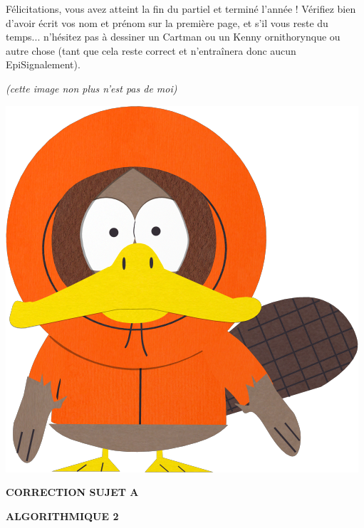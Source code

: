 \documentclass[11pt,a4paper]{article}
\newcommand{\TitreMatiere}{Algorithmique 2}
\begin{document}
\noindent Félicitations, vous avez atteint la fin du partiel et terminé l'année !
Vérifiez bien d'avoir écrit vos nom et prénom sur la première page, et s'il vous reste du temps... n'hésitez pas à dessiner un Cartman ou un Kenny ornithorynque ou autre chose (tant que cela reste correct et n'entraînera donc aucun EpiSignalement).

\begin{center}

{\small \textit{(cette image non plus n'est pas de moi)} }

\medskip

\includegraphics[scale=0.2]{img/kenny-mccormick_platypus.png}

\end{center}

\clearpage



\vfillFirst

\begin{center}

\begin{LARGE}
\textbf{CORRECTION SUJET A}

\bigskip

\textbf{\MakeUppercase{\TitreMatiere}}
\end{LARGE}

\end{center}

\vfillLast
\end{document}
